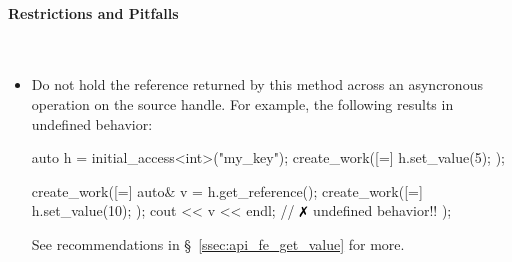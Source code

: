 \paragraph{Restrictions and Pitfalls}\mbox{}\\ 
\begin{itemize}
  \item Do not hold the reference returned by this method across an asyncronous
  operation on the source handle.  For example, the following results in
  undefined behavior:
  \begin{CppCode}
	auto h = initial_access<int>("my_key"); 
	create_work([=]{ h.set_value(5); });
	
	create_work([=]{ 
	  auto& v = h.get_reference();
	  create_work([=]{ h.set_value(10); });
	  cout << v << endl; // $\no$ undefined behavior!!
	});
  \end{CppCode}
  See recommendations in \S~\ref{ssec:api_fe_get_value} for more.
\end{itemize}
